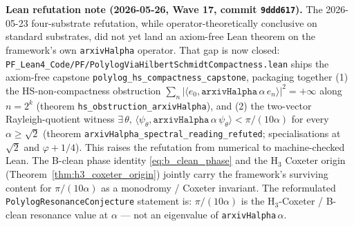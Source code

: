 \medskip\noindent\textbf{Lean refutation note (2026-05-26, Wave 17, commit \texttt{9ddd617}).} The 2026-05-23 four-substrate refutation, while operator-theoretically conclusive on standard substrates, did not yet land an axiom-free Lean theorem on the framework's own \texttt{arxivHalpha} operator. That gap is now closed: \texttt{PF\_Lean4\_Code/PF/PolylogViaHilbertSchmidtCompactness.lean} ships the axiom-free capstone \texttt{polylog\_hs\_compactness\_capstone}, packaging together (1) the HS-non-compactness obstruction $\sum_n |\langle e_0, \texttt{arxivHalpha}\,\alpha\,e_n\rangle|^2 = +\infty$ along $n = 2^k$ (theorem \texttt{hs\_obstruction\_arxivHalpha}), and (2) the two-vector Rayleigh-quotient witness $\exists\,\theta,\,\langle\psi_\theta, \texttt{arxivHalpha}\,\alpha\,\psi_\theta\rangle < \pi/(10\alpha)$ for every $\alpha \geq \sqrt{2}$ (theorem \texttt{arxivHalpha\_spectral\_reading\_refuted}; specialisations at $\sqrt{2}$ and $\varphi+1/4$). This raises the refutation from numerical to machine-checked Lean. The B-clean phase identity \eqref{eq:b_clean_phase} and the H$_3$ Coxeter origin (Theorem~\ref{thm:h3_coxeter_origin}) jointly carry the framework's surviving content for $\pi/(10\alpha)$ as a monodromy / Coxeter invariant. The reformulated \texttt{PolylogResonanceConjecture} statement is: $\pi/(10\alpha)$ is the H$_3$-Coxeter / B-clean resonance value at $\alpha$ --- not an eigenvalue of \texttt{arxivHalpha}$\,\alpha$.

